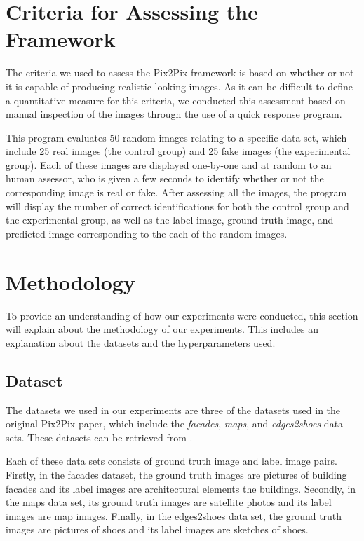 \documentclass[peerreview]{IEEEtran}
\begin{document}
\section{Criteria for Assessing the Framework}
The criteria we used to assess the Pix2Pix framework is based on whether or not it is capable of producing realistic looking images. As it can be difficult to define a quantitative measure for this criteria, we conducted this assessment based on manual inspection of the images through the use of a quick response program.

This program evaluates 50 random images relating to a specific data set, which include 25 real images (the control group) and 25 fake images (the experimental group). Each of these images are displayed one-by-one and at random to an human assessor, who is given a few seconds to identify whether or not the corresponding image is real or fake. After assessing all the images, the program will display the number of correct identifications for both the control group and the experimental group, as well as the label image, ground truth image, and predicted image corresponding to the each of the random images.

\section{Methodology}
To provide an understanding of how our experiments were conducted, this section will explain about the methodology of our experiments. This includes an explanation about the datasets and the hyperparameters used. 

\subsection{Dataset}
The datasets we used in our experiments are three of the datasets used in the original Pix2Pix paper, which include the \textit{facades}, \textit{maps}, and \textit{edges2shoes} data sets. These datasets can be retrieved from \cite{berkeley2017}.

Each of these data sets consists of ground truth image and label image pairs. Firstly, in the facades dataset, the ground truth images are pictures of building facades and its label images are architectural elements the buildings. Secondly, in the maps data set, its ground truth images are satellite photos and its label images are map images. Finally, in the edges2shoes data set, the ground truth images are pictures of shoes and its label images are sketches of shoes.
\end{document}
